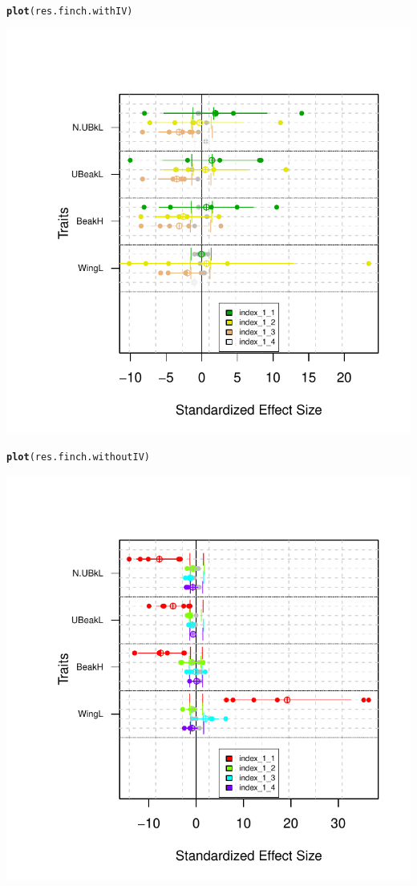 \documentclass[12pt]{article}\usepackage[]{graphicx}\usepackage[]{color}
\makeatletter
\def\maxwidth{ %
  \ifdim\Gin@nat@width>\linewidth
    \linewidth
  \else
    \Gin@nat@width
  \fi
}
\newcommand{\hlstd}[1]{\textcolor[rgb]{0.345,0.345,0.345}{#1}}%
\newcommand{\hlkwd}[1]{\textcolor[rgb]{0.737,0.353,0.396}{\textbf{#1}}}%
\newenvironment{kframe}{%
 \def\at@end@of@kframe{}%
 \ifinner\ifhmode%
  \def\at@end@of@kframe{\end{minipage}}%
  \begin{minipage}{\columnwidth}%
 \fi\fi%
 \def\FrameCommand##1{\hskip\@totalleftmargin \hskip-\fboxsep
 \colorbox{shadecolor}{##1}\hskip-\fboxsep
     \hskip-\linewidth \hskip-\@totalleftmargin \hskip\columnwidth}%
 \MakeFramed {\advance\hsize-\width
   \@totalleftmargin\z@ \linewidth\hsize
   \@setminipage}}%
 {\par\unskip\endMakeFramed%
 \at@end@of@kframe}
\newenvironment{knitrout}{}{} %
\makeatother
\begin{document}
\begin{knitrout}
\begin{kframe}
\begin{verbatim}
\end{verbatim}
\begin{alltt}
\hlkwd{plot}\hlstd{(res.finch.withIV)}
\end{alltt}
\end{kframe}
\includegraphics[width=\maxwidth]{figure/unnamed-chunk-391} 
\begin{kframe}\begin{alltt}
\hlkwd{plot}\hlstd{(res.finch.withoutIV)}
\end{alltt}
\end{kframe}
\includegraphics[width=\maxwidth]{figure/unnamed-chunk-392} 

\end{knitrout}
\end{document}
